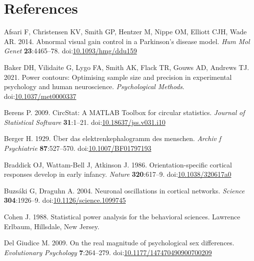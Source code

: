 \documentclass[]{article}
\begin{document}
\hypertarget{references}{%
\section*{References}\label{references}}

\hypertarget{refs}{}
\leavevmode\hypertarget{ref-Afsari2014}{}%
Afsari F, Christensen KV, Smith GP, Hentzer M, Nippe OM, Elliott CJH, Wade AR. 2014. Abnormal visual gain control in a Parkinson's disease model. \emph{Hum Mol Genet} \textbf{23}:4465--78. doi:\href{https://doi.org/10.1093/hmg/ddu159}{10.1093/hmg/ddu159}

\leavevmode\hypertarget{ref-Baker2021}{}%
Baker DH, Vilidaite G, Lygo FA, Smith AK, Flack TR, Gouws AD, Andrews TJ. 2021. Power contours: Optimising sample size and precision in experimental psychology and human neuroscience. \emph{Psychological Methods}. doi:\href{https://doi.org/10.1037/met0000337}{10.1037/met0000337}

\leavevmode\hypertarget{ref-Berens2009}{}%
Berens P. 2009. CircStat: A MATLAB Toolbox for circular statistics. \emph{Journal of Statistical Software} \textbf{31}:1--21. doi:\href{https://doi.org/10.18637/jss.v031.i10}{10.18637/jss.v031.i10}

\leavevmode\hypertarget{ref-Berger1929}{}%
Berger H. 1929. Über das elektrenkephalogramm des menschen. \emph{Archiv f Psychiatrie} \textbf{87}:527--570. doi:\href{https://doi.org/10.1007/BF01797193}{10.1007/BF01797193}

\leavevmode\hypertarget{ref-Braddick1986}{}%
Braddick OJ, Wattam-Bell J, Atkinson J. 1986. Orientation-specific cortical responses develop in early infancy. \emph{Nature} \textbf{320}:617--9. doi:\href{https://doi.org/10.1038/320617a0}{10.1038/320617a0}

\leavevmode\hypertarget{ref-Buzsaki2004}{}%
Buzsáki G, Draguhn A. 2004. Neuronal oscillations in cortical networks. \emph{Science} \textbf{304}:1926--9. doi:\href{https://doi.org/10.1126/science.1099745}{10.1126/science.1099745}

\leavevmode\hypertarget{ref-Cohen1988}{}%
Cohen J. 1988. Statistical power analysis for the behavioral sciences. Lawrence Erlbaum, Hillsdale, New Jersey.

\leavevmode\hypertarget{ref-Giudice2009}{}%
Del Giudice M. 2009. On the real magnitude of psychological sex differences. \emph{Evolutionary Psychology} \textbf{7}:264--279. doi:\href{https://doi.org/10.1177/147470490900700209}{10.1177/147470490900700209}
\end{document}
